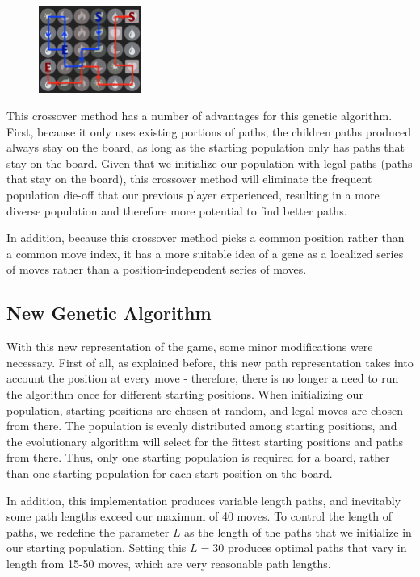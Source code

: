 \documentclass[journal,final,letterpaper,11pt]{IEEEtran}
\begin{document}
\begin{figure}[h]
    \centering
    \includegraphics[width=0.3\textwidth]{after.png}
    \label{fig:after}
\end{figure}

This crossover method has a number of advantages for this genetic algorithm. First, because it only uses existing portions of paths, the children paths produced always stay on the board, as long as the starting population only has paths that stay on the board. Given that we initialize our population with legal paths (paths that stay on the board), this crossover method will eliminate the frequent population die-off that our previous player experienced, resulting in a more diverse population and therefore more potential to find better paths.

In addition, because this crossover method picks a common position rather than a common move index, it has a more suitable idea of a gene as a localized series of moves rather than a position-independent series of moves.

\subsection{New Genetic Algorithm}
With this new representation of the game, some minor modifications were necessary. First of all, as explained before, this new path representation takes into account the position at every move - therefore, there is no longer a need to run the algorithm once for different starting positions. When initializing our population, starting positions are chosen at random, and legal moves are chosen from there. The population is evenly distributed among starting positions, and the evolutionary algorithm will select for the fittest starting positions and paths from there. Thus, only one starting population is required for a board, rather than one starting population for each start position on the board.

In addition, this implementation produces variable length paths, and inevitably some path lengths exceed our maximum of 40 moves. To control the length of paths, we redefine the parameter $L$ as the length of the paths that we initialize in our starting population. Setting this $L=30$ produces optimal paths that vary in length from 15-50 moves, which are very reasonable path lengths.
\end{document}
